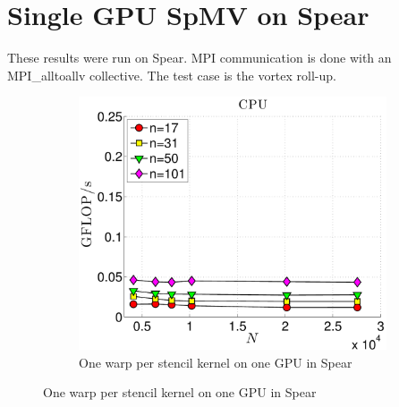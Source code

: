 \section{Single GPU SpMV on Spear}

These results were run on Spear. MPI communication is done with an MPI\_alltoallv collective. The test case is the vortex roll-up. 

\begin{figure}
\centering
\begin{subfigure}[t]{0.425\textwidth}
\includegraphics[width=1.0\textwidth]{../figures/spear_results/vortex/gflops_cpu_1proc_oneWarpPerStencil-eps-converted-to.pdf}
\caption{One warp per stencil kernel on one GPU in Spear}
\label{fig:alltoall_1proc_warp}
\end{subfigure} 


\end{figure}
